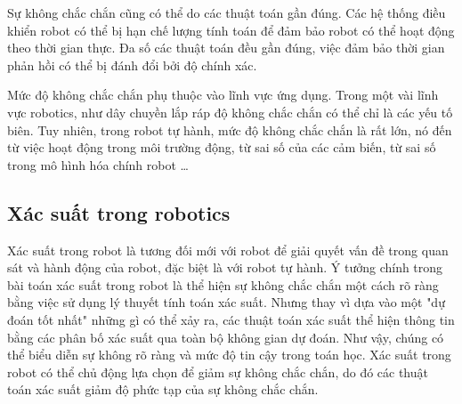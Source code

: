 Sự không chắc chắn cũng có thể do các thuật toán gần đúng. Các hệ thống điều khiển robot có thể bị hạn chế lượng tính toán để đảm bảo robot có thể hoạt động theo thời gian thực. Đa số các thuật toán đều gần đúng, việc đảm bảo thời gian phản hồi có thể bị đánh đổi bởi độ chính xác.

Mức độ không chắc chắn phụ thuộc vào lĩnh vực ứng dụng. Trong một vài lĩnh vực robotics, như dây chuyền lắp ráp độ không chắc chắn có thể chỉ là các yếu tố biên. Tuy nhiên, trong robot tự hành, mức độ không chắc chắn là rất lớn, nó đến từ việc hoạt động trong môi trường động, từ sai số của các cảm biến, từ sai số trong mô hình hóa chính robot \dots

\subsection{Xác suất trong robotics} \label{subsec:probabilityinRobotics}

Xác suất trong robot là tương đối mới với robot để giải quyết vấn đề trong quan sát và hành động của robot, đặc biệt là với robot tự hành. Ý tưởng chính trong bài toán xác suất trong robot là thể hiện sự không chắc chắn một cách rõ ràng bằng việc sử dụng lý thuyết tính toán xác suất. Nhưng thay vì dựa vào một "dự đoán tốt nhất" những gì có thể xảy ra, các thuật toán xác suất thể hiện thông tin bằng các phân bố xác suất qua toàn bộ không gian dự đoán. Như vậy, chúng có thể biểu diễn sự không rõ ràng và mức độ tin cậy trong toán học. Xác suất trong robot có thể chủ động lựa chọn để giảm sự không chắc chắn, do đó các thuật toán xác suất giảm độ phức tạp của sự không chắc chắn.

